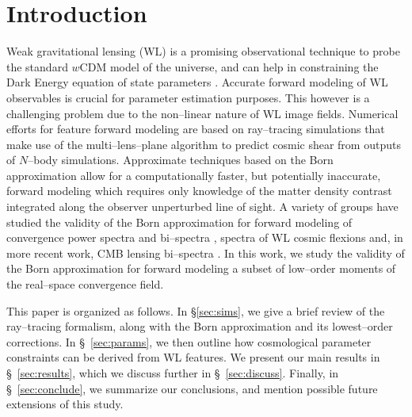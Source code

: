\documentclass[reprint,aps,prd,superscriptaddress,showkeys,showpacs]{revtex4-1}
\begin{document}
\maketitle



\section{Introduction}
%
Weak gravitational lensing (WL) is a promising observational technique to probe the standard $w$CDM model of the universe, and can help in constraining the Dark Energy equation of state parameters \citep{wlreview}. Accurate forward modeling of WL observables is crucial for parameter estimation purposes. This however is a challenging problem due to the non--linear nature of WL image fields. Numerical efforts for feature forward modeling are based on ray--tracing simulations that make use of the multi--lens--plane algorithm \citep{RayTracingJain,RayTracingHartlap} to predict cosmic shear from outputs of $N$--body simulations. Approximate techniques based on the Born approximation allow for a computationally faster, but potentially inaccurate, forward modeling \citep{RayTracingHartlap} which requires only knowledge of the matter density contrast integrated along the observer unperturbed line of sight. A variety of groups have studied the validity of the Born approximation for forward modeling of convergence power spectra and bi--spectra \citep{WLBispectrumDodelson}, spectra of WL cosmic flexions \citep{BornFlexion} and, in more recent work, CMB lensing bi--spectra \citep{CMBPrattenLewis}. In this work, we study the validity of the Born approximation for forward modeling a subset of low--order moments of the real--space convergence field. 

This paper is organized as follows.  In \S\ref{sec:sims}, we give a brief review of the ray--tracing formalism, along with the Born approximation and its lowest--order corrections. In \S~\ref{sec:params}, we then outline how cosmological parameter constraints can be derived from WL features. We present our main results in \S~\ref{sec:results}, which we discuss further in \S~\ref{sec:discuss}.  Finally, in \S~\ref{sec:conclude}, we summarize our conclusions, and mention possible future extensions of this study.       

\end{document}
